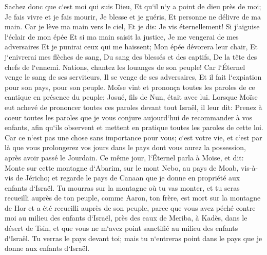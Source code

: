 \verse Sachez donc que c`est moi qui suis Dieu, Et qu`il n`y a point de dieu près de moi; Je fais vivre et je fais mourir, Je blesse et je guéris, Et personne ne délivre de ma main. 
\verse Car je lève ma main vers le ciel, Et je dis: Je vis éternellement! 
\verse Si j`aiguise l`éclair de mon épée Et si ma main saisit la justice, Je me vengerai de mes adversaires Et je punirai ceux qui me haïssent; 
\verse Mon épée dévorera leur chair, Et j`enivrerai mes flèches de sang, Du sang des blessés et des captifs, De la tête des chefs de l`ennemi. 
\verse Nations, chantez les louanges de son peuple! Car l`Éternel venge le sang de ses serviteurs, Il se venge de ses adversaires, Et il fait l`expiation pour son pays, pour son peuple. 
\verse Moïse vint et prononça toutes les paroles de ce cantique en présence du peuple; Josué, fils de Nun, était avec lui. 
\verse Lorsque Moïse eut achevé de prononcer toutes ces paroles devant tout Israël, 
\verse il leur dit: Prenez à coeur toutes les paroles que je vous conjure aujourd`hui de recommander à vos enfants, afin qu`ils observent et mettent en pratique toutes les paroles de cette loi. 
\verse Car ce n`est pas une chose sans importance pour vous; c`est votre vie, et c`est par là que vous prolongerez vos jours dans le pays dont vous aurez la possession, après avoir passé le Jourdain. 
\verse Ce même jour, l`Éternel parla à Moïse, et dit: 
\verse Monte sur cette montagne d`Abarim, sur le mont Nebo, au pays de Moab, vis-à-vis de Jéricho; et regarde le pays de Canaan que je donne en propriété aux enfants d`Israël. 
\verse Tu mourras sur la montagne où tu vas monter, et tu seras recueilli auprès de ton peuple, comme Aaron, ton frère, est mort sur la montagne de Hor et a été recueilli auprès de son peuple, 
\verse parce que vous avez péché contre moi au milieu des enfants d`Israël, près des eaux de Meriba, à Kadès, dans le désert de Tsin, et que vous ne m`avez point sanctifié au milieu des enfants d`Israël. 
\verse Tu verras le pays devant toi; mais tu n`entreras point dans le pays que je donne aux enfants d`Israël. 

